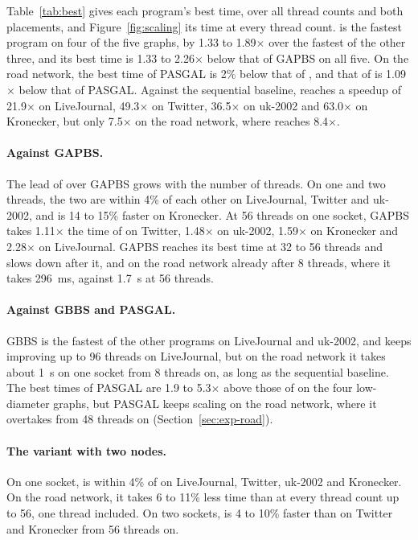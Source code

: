 Table~\ref{tab:best} gives each program's best time, over all thread counts and both placements, and Figure~\ref{fig:scaling} its time at every thread count. \wfdo is the fastest program on four of the five graphs, by 1.33 to 1.89$\times$ over the fastest of the other three, and its best time is 1.33 to 2.26$\times$ below that of GAPBS on all five. On the road network, the best time of PASGAL is 2\% below that of \wfdo, and that of \wfdomem is 1.09$\times$ below that of PASGAL. Against the sequential baseline, \wfdo reaches a speedup of 21.9$\times$ on LiveJournal, 49.3$\times$ on Twitter, 36.5$\times$ on uk-2002 and 63.0$\times$ on Kronecker, but only 7.5$\times$ on the road network, where \wfdomem reaches 8.4$\times$.

\paragraph{Against GAPBS\@.} The lead of \wfdo over GAPBS grows with the number of threads. On one and two threads, the two are within 4\% of each other on LiveJournal, Twitter and uk-2002, and \wfdo is 14 to 15\% faster on Kronecker. At 56 threads on one socket, GAPBS takes 1.11$\times$ the time of \wfdo on Twitter, 1.48$\times$ on uk-2002, 1.59$\times$ on Kronecker and 2.28$\times$ on LiveJournal. GAPBS reaches its best time at 32 to 56 threads and slows down after it, and on the road network already after 8 threads, where it takes 296~ms, against 1.7~s at 56 threads.

\paragraph{Against GBBS and PASGAL\@.} GBBS is the fastest of the other programs on LiveJournal and uk-2002, and keeps improving up to 96 threads on LiveJournal, but on the road network it takes about 1~s on one socket from 8 threads on, as long as the sequential baseline. The best times of PASGAL are 1.9 to 5.3$\times$ above those of \wfdo on the four low-diameter graphs, but PASGAL keeps scaling on the road network, where it overtakes \wfdo from 48 threads on (Section~\ref{sec:exp-road}).

\paragraph{The variant with two nodes.} On one socket, \wfdomem is within 4\% of \wfdo on LiveJournal, Twitter, uk-2002 and Kronecker. On the road network, it takes 6 to 11\% less time than \wfdo at every thread count up to 56, one thread included. On two sockets, \wfdo is 4 to 10\% faster than \wfdomem on Twitter and Kronecker from 56 threads on.

